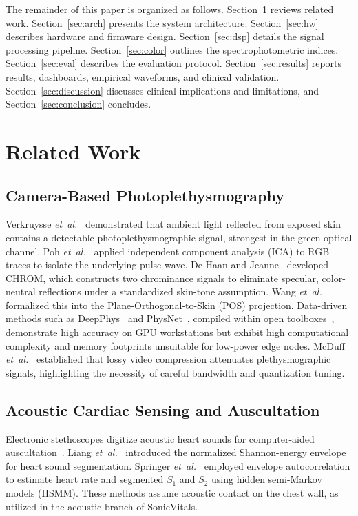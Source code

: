 \documentclass[journal]{IEEEtran}
\begin{document}
The remainder of this paper is organized as follows. Section~\ref{sec:related} reviews related work. Section~\ref{sec:arch} presents the system architecture. Section~\ref{sec:hw} describes hardware and firmware design. Section~\ref{sec:dsp} details the signal processing pipeline. Section~\ref{sec:color} outlines the spectrophotometric indices. Section~\ref{sec:eval} describes the evaluation protocol. Section~\ref{sec:results} reports results, dashboards, empirical waveforms, and clinical validation. Section~\ref{sec:discussion} discusses clinical implications and limitations, and Section~\ref{sec:conclusion} concludes.

\section{Related Work}
\label{sec:related}

\subsection{Camera-Based Photoplethysmography}
Verkruysse \textit{et~al.}~\cite{verkruysse2008} demonstrated that ambient light reflected from exposed skin contains a detectable photoplethysmographic signal, strongest in the green optical channel. Poh \textit{et~al.}~\cite{poh2010} applied independent component analysis (ICA) to RGB traces to isolate the underlying pulse wave. De Haan and Jeanne~\cite{dehaan2013chrom} developed CHROM, which constructs two chrominance signals to eliminate specular, color-neutral reflections under a standardized skin-tone assumption. Wang \textit{et~al.}~\cite{wang2017pos} formalized this into the Plane-Orthogonal-to-Skin (POS) projection. Data-driven methods such as DeepPhys~\cite{chen2018deepphys} and PhysNet~\cite{yu2019physnet}, compiled within open toolboxes~\cite{liu2023toolbox}, demonstrate high accuracy on GPU workstations but exhibit high computational complexity and memory footprints unsuitable for low-power edge nodes. McDuff \textit{et~al.}~\cite{mcduff2017compression} established that lossy video compression attenuates plethysmographic signals, highlighting the necessity of careful bandwidth and quantization tuning.

\subsection{Acoustic Cardiac Sensing and Auscultation}
Electronic stethoscopes digitize acoustic heart sounds for computer-aided auscultation~\cite{leng2015stethoscope}. Liang \textit{et~al.}~\cite{liang1997envelogram} introduced the normalized Shannon-energy envelope for heart sound segmentation. Springer \textit{et~al.}~\cite{springer2016hsmm} employed envelope autocorrelation to estimate heart rate and segmented $S_1$ and $S_2$ using hidden semi-Markov models (HSMM). These methods assume acoustic contact on the chest wall, as utilized in the acoustic branch of SonicVitals.
\end{document}
